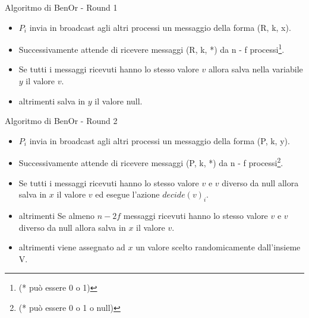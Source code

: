 \documentclass{beamer}
\begin{document}
\begin{frame}{Algoritmo di BenOr - Round 1}
    \begin{itemize}
        \item $P_{i}$ invia in broadcast agli altri processi un messaggio della forma (R, k, x). 
        
        \item Successivamente attende di ricevere messaggi (R, k, *) da n - f processi\footnote{(* può essere 0 o 1)}.
        
        \item Se tutti i messaggi ricevuti hanno lo stesso valore $v$ allora salva nella variabile $y$ il valore $v$.
            
        \item altrimenti salva in $y$ il valore null.
    
    \end{itemize}
\end{frame}


\begin{frame}{Algoritmo di BenOr - Round 2}

    \begin{itemize}
        \item $P_{i}$ invia in broadcast agli altri processi un messaggio della forma (P, k, y).
    
        \item Successivamente attende di ricevere messaggi (P, k, *) da n - f processi\footnote{(* può essere 0 o 1 o null)}.
        
        \item Se tutti i messaggi ricevuti hanno lo stesso valore $v$ e $v$ diverso da null allora salva in $x$ il valore $v$ ed esegue l'azione $decide(v)_{i}$.
        
        \item altrimenti Se almeno $n - 2f$ messaggi ricevuti hanno lo stesso valore $v$ e $v$ diverso da null allora salva in $x$ il valore $v$.
        
        \item altrimenti viene assegnato ad $x$ un valore scelto randomicamente dall'insieme V.
    \end{itemize}
\end{frame}



\end{document}
